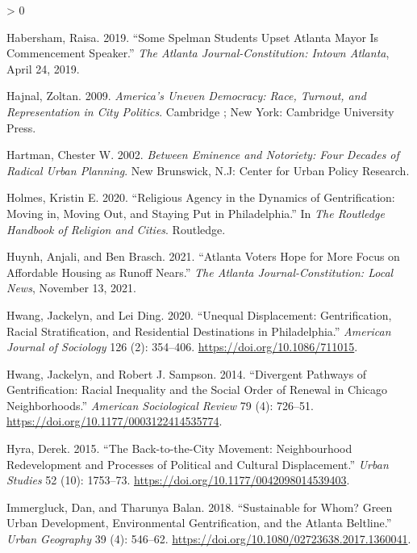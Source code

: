 \documentclass[
  12pt,
]{article}
\newlength{\cslhangindent}
\newenvironment{CSLReferences}[2] %
 {%
  \setlength{\parindent}{0pt}
  \ifodd #1 \everypar{\setlength{\hangindent}{\cslhangindent}}\ignorespaces\fi
  \ifnum #2 > 0
  \setlength{\parskip}{#2\baselineskip}
  \fi
 }%
 {}
\begin{document}
\begin{CSLReferences}{1}{0}
\leavevmode\hypertarget{ref-Habersham2019}{}%
Habersham, Raisa. 2019. {``Some {Spelman} Students Upset {Atlanta} Mayor Is Commencement Speaker.''} \emph{The Atlanta Journal-Constitution: Intown Atlanta}, April 24, 2019.

\leavevmode\hypertarget{ref-Hajnal2009}{}%
Hajnal, Zoltan. 2009. \emph{America's Uneven Democracy: Race, Turnout, and Representation in City Politics}. {Cambridge ; New York}: {Cambridge University Press}.

\leavevmode\hypertarget{ref-Hartman2002}{}%
Hartman, Chester W. 2002. \emph{Between Eminence and Notoriety: Four Decades of Radical Urban Planning}. {New Brunswick, N.J}: {Center for Urban Policy Research}.

\leavevmode\hypertarget{ref-Holmes2020}{}%
Holmes, Kristin E. 2020. {``Religious Agency in the Dynamics of Gentrification: {Moving} in, Moving Out, and Staying Put in {Philadelphia}.''} In \emph{The {Routledge Handbook} of {Religion} and {Cities}}. {Routledge}.

\leavevmode\hypertarget{ref-Huynh2021}{}%
Huynh, Anjali, and Ben Brasch. 2021. {``Atlanta Voters Hope for More Focus on Affordable Housing as Runoff Nears.''} \emph{The Atlanta Journal-Constitution: Local News}, November 13, 2021.

\leavevmode\hypertarget{ref-Hwang2020}{}%
Hwang, Jackelyn, and Lei Ding. 2020. {``Unequal {Displacement}: {Gentrification}, {Racial Stratification}, and {Residential Destinations} in {Philadelphia}.''} \emph{American Journal of Sociology} 126 (2): 354--406. \url{https://doi.org/10.1086/711015}.

\leavevmode\hypertarget{ref-Hwang2014}{}%
Hwang, Jackelyn, and Robert J. Sampson. 2014. {``Divergent {Pathways} of {Gentrification}: {Racial Inequality} and the {Social Order} of {Renewal} in {Chicago Neighborhoods}.''} \emph{American Sociological Review} 79 (4): 726--51. \url{https://doi.org/10.1177/0003122414535774}.

\leavevmode\hypertarget{ref-Hyra2015}{}%
Hyra, Derek. 2015. {``The Back-to-the-City Movement: {Neighbourhood} Redevelopment and Processes of Political and Cultural Displacement.''} \emph{Urban Studies} 52 (10): 1753--73. \url{https://doi.org/10.1177/0042098014539403}.

\leavevmode\hypertarget{ref-Immergluck2018}{}%
Immergluck, Dan, and Tharunya Balan. 2018. {``Sustainable for Whom? {Green} Urban Development, Environmental Gentrification, and the {Atlanta Beltline}.''} \emph{Urban Geography} 39 (4): 546--62. \url{https://doi.org/10.1080/02723638.2017.1360041}.


\end{CSLReferences}
\end{document}
